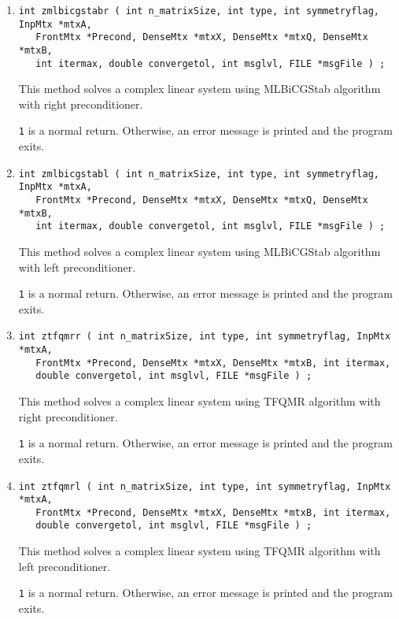 \begin{enumerate}
\item
\begin{verbatim}
int zmlbicgstabr ( int n_matrixSize, int type, int symmetryflag, InpMtx *mtxA,
   FrontMtx *Precond, DenseMtx *mtxX, DenseMtx *mtxQ, DenseMtx *mtxB,
   int itermax, double convergetol, int msglvl, FILE *msgFile ) ;
\end{verbatim}
\par
This method solves a complex linear system using MLBiCGStab algorithm with right 
preconditioner. 
\par {}
{\tt 1} is a normal return.  Otherwise, an error message is printed and 
the program exits.

\item
\begin{verbatim}
int zmlbicgstabl ( int n_matrixSize, int type, int symmetryflag, InpMtx *mtxA,
   FrontMtx *Precond, DenseMtx *mtxX, DenseMtx *mtxQ, DenseMtx *mtxB,
   int itermax, double convergetol, int msglvl, FILE *msgFile ) ;
\end{verbatim}
\par
This method solves a complex linear system using MLBiCGStab algorithm with left 
preconditioner. 
\par {}
{\tt 1} is a normal return.  Otherwise, an error message is printed and 
the program exits.

\item
\begin{verbatim}
int ztfqmrr ( int n_matrixSize, int type, int symmetryflag, InpMtx *mtxA,
   FrontMtx *Precond, DenseMtx *mtxX, DenseMtx *mtxB, int itermax,
   double convergetol, int msglvl, FILE *msgFile ) ;
\end{verbatim}
\par
This method solves a complex linear system using TFQMR algorithm with right 
preconditioner. 
\par {}
{\tt 1} is a normal return.  Otherwise, an error message is printed and 
the program exits.

\item
\begin{verbatim}
int ztfqmrl ( int n_matrixSize, int type, int symmetryflag, InpMtx *mtxA,
   FrontMtx *Precond, DenseMtx *mtxX, DenseMtx *mtxB, int itermax,
   double convergetol, int msglvl, FILE *msgFile ) ;
\end{verbatim}
\par
This method solves a complex linear system using TFQMR algorithm with left
preconditioner. 
\par {}
{\tt 1} is a normal return.  Otherwise, an error message is printed and 
the program exits.


\end{enumerate}
